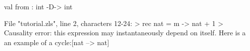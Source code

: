 \runverbatimfalse
{}
\begin{RunVerbatimMsg}
val from : int -D-> int
\end{RunVerbatimMsg}
\begin{RunVerbatimErr}
File "tutorial.zls", line 2, characters 12-24:
>  rec nat = m -> nat + 1
>            ^^^^^^^^^^^^
Causality error: this expression may instantaneously depend on itself.
Here is a an example of a cycle:[nat --> nat]
\end{RunVerbatimErr}
